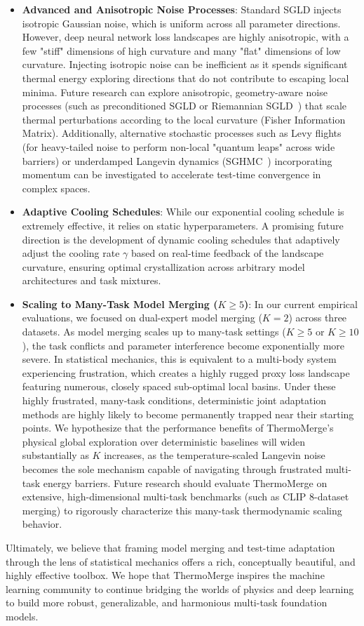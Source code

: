 \begin{itemize}
\item \textbf{Advanced and Anisotropic Noise Processes}: Standard SGLD injects isotropic Gaussian noise, which is uniform across all parameter directions.
However, deep neural network loss landscapes are highly anisotropic, with a few "stiff" dimensions of high curvature and many "flat" dimensions of low curvature.
Injecting isotropic noise can be inefficient as it spends significant thermal energy exploring directions that do not contribute to escaping local minima.
Future research can explore anisotropic, geometry-aware noise processes (such as preconditioned SGLD or Riemannian SGLD~\cite{girolami2011riemann}) that scale thermal perturbations according to the local curvature (Fisher Information Matrix).
Additionally, alternative stochastic processes such as Levy flights (for heavy-tailed noise to perform non-local "quantum leaps" across wide barriers) or underdamped Langevin dynamics (SGHMC~\cite{chen2014stochastic,ma2015complete}) incorporating momentum can be investigated to accelerate test-time convergence in complex spaces.
\item \textbf{Adaptive Cooling Schedules}: While our exponential cooling schedule is extremely effective, it relies on static hyperparameters.
A promising future direction is the development of dynamic cooling schedules that adaptively adjust the cooling rate $\gamma$ based on real-time feedback of the landscape curvature, ensuring optimal crystallization across arbitrary model architectures and task mixtures.
\item \textbf{Scaling to Many-Task Model Merging ($K \ge 5$)}: In our current empirical evaluations, we focused on dual-expert model merging ($K = 2$) across three datasets.
As model merging scales up to many-task settings ($K \ge 5$ or $K \ge 10$), the task conflicts and parameter interference become exponentially more severe.
In statistical mechanics, this is equivalent to a multi-body system experiencing frustration, which creates a highly rugged proxy loss landscape featuring numerous, closely spaced sub-optimal local basins.
Under these highly frustrated, many-task conditions, deterministic joint adaptation methods are highly likely to become permanently trapped near their starting points.
We hypothesize that the performance benefits of ThermoMerge's physical global exploration over deterministic baselines will widen substantially as $K$ increases, as the temperature-scaled Langevin noise becomes the sole mechanism capable of navigating through frustrated multi-task energy barriers.
Future research should evaluate ThermoMerge on extensive, high-dimensional multi-task benchmarks (such as CLIP 8-dataset merging) to rigorously characterize this many-task thermodynamic scaling behavior.
\end{itemize}

Ultimately, we believe that framing model merging and test-time adaptation through the lens of statistical mechanics offers a rich, conceptually beautiful, and highly effective toolbox.
We hope that ThermoMerge inspires the machine learning community to continue bridging the worlds of physics and deep learning to build more robust, generalizable, and harmonious multi-task foundation models.